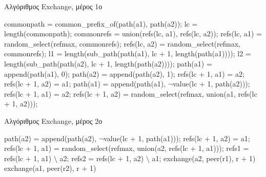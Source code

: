 \begin{algorithm}
\caption{Αλγόριθμος Exchange, μέρος 1ο}
\label{algo:ExchangePart1}
\begin{algorithmic}[1]
        \State commonpath = common\_prefix\_of(path(a1), path(a2));
        \State lc = length(commonpath);
            \State commonrefs = union(refs(lc, a1), refs(lc, a2));
            \State refs(lc, a1) = random\_select(refmax, commonrefs);
            \State refs(lc, a2) = random\_select(refmax, commonrefs);
            \State l1 = length(sub\_path(path(a1), lc + 1, length(path(a1))));
            \State l2 = length(sub\_path(path(a2), lc + 1, length(path(a2))));            
\newline {}
                \State path(a1) = append(path(a1), 0);
                \State path(a2) = append(path(a2), 1);
                \State refs(lc + 1, a1) = {a2};
                \State refs(lc + 1, a2) = {a1};
            \EndIf
\newline {}
                \State path(a1) = append(path(a1), $\neg$value(lc + 1, path(a2)));
                \State refs(lc + 1, a1) = {a2};
                \State refs(lc + 1, a2) = random\_select(refmax, union({a1}, refs(lc + 1, a2)));
            \EndIf
{}
\end{algorithmic}
\end{algorithm}

\begin{algorithm}[h]
\caption{Αλγόριθμος Exchange, μέρος 2ο}
\label{algo:ExchangePart2}
\begin{algorithmic}[1]
\item[] 
                \State path(a2) = append(path(a2), $\neg$value(lc + 1, path(a1)));
                \State refs(lc + 1, a2) = {a1};
                \State refs(lc + 1, a1) = random\_select(refmax, union({a2}, refs(lc + 1, a1)));
            \EndIf
\newline {}
                \State refs1 = refs(lc + 1, a1) $\setminus$ {a2};
                \State refs2 = refs(lc + 1, a2) $\setminus$ {a1};
                        \State exchange(a2, peer(r1), r + 1)
                    \EndIf
                \EndFor
                        \State exchange(a1, peer(r2), r + 1)
                    \EndIf
                \EndFor
            \EndIf
        \EndIf
  \EndProcedure
\end{algorithmic}
\end{algorithm}


